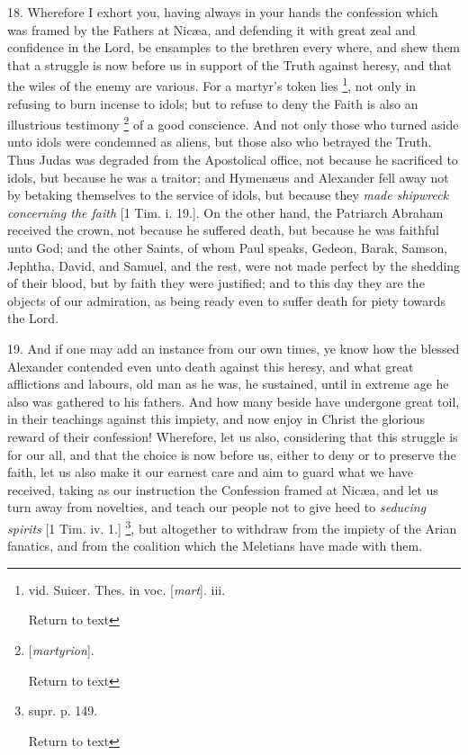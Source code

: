 18. Wherefore I exhort you, having always in your
hands the confession which was framed by the Fathers at Nicæa, and
defending it with great zeal and confidence in the Lord, be ensamples
to the brethren every where, and shew them that a struggle is now
before us in support of the Truth against heresy, and that the wiles
of the enemy are various. For a martyr's token lies \footnote{vid. Suicer. Thes. in voc. [\emph{mart}]. iii.

Return to text}, not only in refusing to burn incense to idols; but to refuse to
deny the Faith is also an illustrious testimony \footnote{[\emph{martyrion}].

Return to text} of a good conscience. And not only those who turned aside unto
idols were condemned as aliens, but those also who betrayed the Truth.
Thus Judas was degraded from the Apostolical office, not because he
sacrificed to idols, but because he was a traitor; and Hymenæus and
Alexander fell away not by betaking themselves to the service of
idols, but because they \emph{made shipwreck concerning the faith} [1
Tim. i. 19.]. On the other hand, the Patriarch Abraham received the
crown, not because he suffered death, but because he was faithful unto
God; and the other Saints, of whom Paul speaks, Gedeon, Barak, Samson,
Jephtha, David, and Samuel, and the rest, were not made perfect by the
shedding of their blood, but by faith they were justified; and to this
day they are the objects of our admiration, as being ready even to
suffer death for piety towards the Lord.

19. And if one may add an instance from our own
times, ye know how the blessed Alexander contended even unto death
against this heresy, and what great afflictions and labours, old man
as he was, he sustained, until in extreme age he also was gathered to
his fathers. And how many beside have undergone great toil, in their
teachings against this impiety, and now enjoy in Christ the glorious
reward of their confession! Wherefore, let us also, considering that
this struggle is for our all, and that the choice is now before us,
either to deny or to preserve the faith, let us also make it our
earnest care and aim to guard what we have received, taking as our
instruction the Confession framed at Nicæa, and let us turn away from
novelties, and teach our people not to give heed to \emph{seducing
spirits} [1 Tim. iv. 1.] \footnote{supr. p. 149.

Return to text}, but
altogether to withdraw from the impiety of the Arian fanatics, and
from the coalition which the Meletians have made with them.


